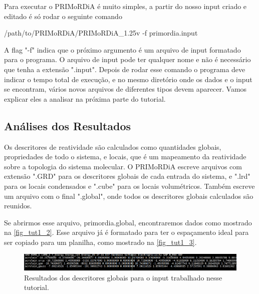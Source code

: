 \documentclass[a4paper,11pt]{refart}
\begin{document}
Para executar o PRIMoRDiA é muito simples, a partir do nosso input criado e editado é só rodar o seguinte comando

\hspace*{-\leftmarginwidth}
\begin{minipage}{\fullwidth}
\begin{commandshell}/path/to/PRIMoRDiA/PRIMoRDiA_1.25v -f primordia.input\end{commandshell}
\end{minipage}

A flag "-f" indica que o próximo argumento é um arquivo de input formatado para o programa. O arquivo de input pode ter qualquer nome e não é necessário que tenha a extensão ".input". Depois de rodar esse comando o programa deve indicar o tempo total de execução, e no mesmo diretório onde os dados e o input se encontram, vários novos arquivos de diferentes tipos devem aparecer. Vamos explicar eles a analisar na próxima parte do tutorial.


\subsection{Análises dos Resultados}

Os descritores de reatividade são calculados como quantidades globais, propriedades de todo o sistema, e locais, que é um mapeamento da reatividade sobre a topologia do sistema molecular. O PRIMoRDiA escreve arquivos com extensão ".GRD" para os descritores globais de cada entrada do sistema, e ".lrd" para os locais condensados e ".cube" para os locais volumétricos. Também escreve um arquivo com o final ".global", onde todos os descritores globais calculados são reunidos.

Se abrirmos esse arquivo, primordia.global, encontraremos dados como mostrado na \autoref{fig_tut1_2}. Esse arquivo já é formatado para ter o espaçamento ideal para ser copiado para um planilha, como mostrado na \autoref{fig_tut1_3}.


\hspace*{-1.2\leftmarginwidth}
\begin{minipage}{\fullwidth}
	\begin{figure}[H]
		\begin{center}
			\includegraphics[width=7in]{images/img3}
			\caption{Resultados dos descritores globais para o input trabalhado nesse tutorial.}
			\label{fig_tut1_2}
		\end{center}
	\end{figure}
\end{minipage}	
\end{document}
